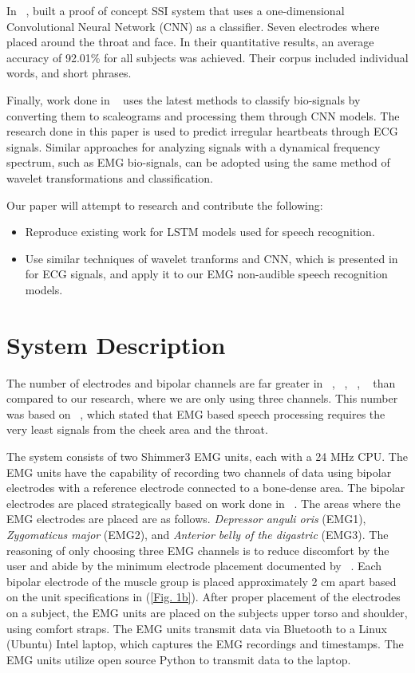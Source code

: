 \documentclass[conference]{IEEEtran}
\begin{document}
In ~\cite{kapur_alterego:_2018}, built a proof of concept SSI system that uses
a one-dimensional Convolutional Neural Network (CNN) as a classifier. Seven electrodes
where placed around the throat and face. In their quantitative results, an average accuracy of 92.01\% for all subjects was achieved. Their corpus included individual words, and short phrases.

Finally, work done in ~\cite{noauthor_classify_nodate} uses the latest methods to classify bio-signals by converting them to scaleograms and processing them through CNN models. The research done in this paper is used to predict irregular heartbeats through ECG signals. Similar approaches for analyzing signals with a dynamical frequency spectrum, such as EMG bio-signals, can be adopted using the same method of wavelet transformations and classification. 

Our paper will attempt to research and contribute the following:
\begin{itemize}
  \item Reproduce existing work for LSTM models used for speech recognition. 
  \item Use similar techniques of wavelet tranforms and CNN, which is presented in\cite{noauthor_classify_nodate} for ECG signals, and apply it to our EMG non-audible speech recognition models. 
\end{itemize}

\section{System Description}
The number of electrodes and bipolar channels are far greater in ~\cite{kapur_alterego:_2018}, ~\cite{wand_pattern_2014}, ~\cite{janke_emg--speech:_2017}, ~\cite{maier-hein_session_2005} than compared to our research, where we are only using three channels. This number was based on ~\cite{maier-hein_session_2005}, which stated that EMG based speech processing requires the very least signals from the cheek area and the throat. 

The system consists of two Shimmer3 EMG units, each with a 24 MHz CPU. The EMG units have the capability of recording two channels of data using  bipolar electrodes with a reference electrode connected to a bone-dense area. The bipolar electrodes are placed strategically based on work done in ~\cite{lopez-larraz_syllable-based_2010}. The areas where the EMG electrodes are placed are as follows. \textit{Depressor anguli oris} (EMG1), \textit{Zygomaticus major} (EMG2), and \textit{Anterior belly of the digastric} (EMG3). The reasoning of only choosing three EMG channels is to reduce discomfort by the user and abide by the minimum electrode placement documented by ~\cite{maier-hein_session_2005}. Each bipolar electrode of the muscle group is placed approximately 2 cm apart based on the unit specifications in (\figurename \ref{Fig. 1b}). After proper placement of the electrodes on a subject, the EMG units are placed on the subjects upper torso and shoulder, using comfort straps. The EMG units transmit data via Bluetooth to a Linux (Ubuntu) Intel laptop, which captures the EMG recordings and timestamps. The EMG units utilize open source Python to transmit data to the laptop.
\end{document}
